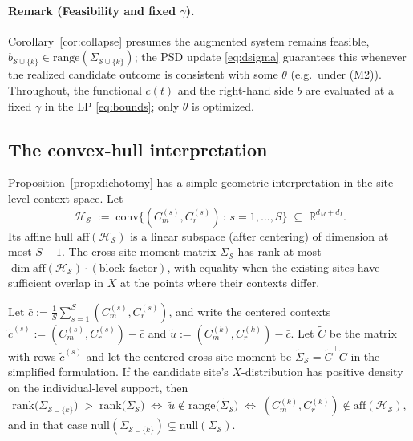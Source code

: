 \paragraph{Remark (Feasibility and fixed $\gamma$).}
Corollary~\ref{cor:collapse} presumes the augmented system remains feasible,
$b_{\mathcal{S}\cup\{k\}}\in\mathrm{range}(\Sigma_{\mathcal{S}\cup\{k\}})$; the
PSD update \eqref{eq:dsigma} guarantees this whenever the realized candidate
outcome is consistent with some $\theta$ (e.g.\ under (M2)). Throughout, the
functional $c(t)$ and the right-hand side $b$ are evaluated at a fixed $\gamma$
in the LP \eqref{eq:bounds}; only $\theta$ is optimized.

\subsection{The convex-hull interpretation}
\label{sec:hull-interp}

Proposition~\ref{prop:dichotomy} has a simple geometric interpretation in the
site-level context space. Let
\[
\mathcal{H}_\mathcal{S} \;:=\; \mathrm{conv}\!\bigl\{(C_m^{(s)}, C_r^{(s)})\,:\,
 s = 1, \ldots, S\bigr\} \;\subseteq\; \mathbb{R}^{d_M+d_I}.
\]
Its affine hull $\mathrm{aff}(\mathcal{H}_\mathcal{S})$ is a linear
subspace (after centering) of dimension at most $S-1$. The cross-site moment
matrix $\Sigma_\mathcal{S}$ has rank at most $\dim\mathrm{aff}(\mathcal{H}_\mathcal{S})
 \cdot (\text{block factor})$, with equality when the existing sites have
sufficient overlap in $X$ at the points where their contexts differ.

\begin{proposition}
\label{prop:hull}
Let $\bar c := \tfrac1S\sum_{s=1}^S (C_m^{(s)},C_r^{(s)})$, and write the
centered contexts $\tilde c^{(s)} := (C_m^{(s)},C_r^{(s)})-\bar c$ and
$\tilde u := (C_m^{(k)},C_r^{(k)})-\bar c$. Let $\tilde C$ be the matrix with
rows $\tilde c^{(s)}$ and let the centered cross-site moment be
$\tilde\Sigma_\mathcal{S}=\tilde C^\top\tilde C$ in the simplified formulation.
If the candidate site's $X$-distribution has
positive density on the individual-level support, then
\[
\mathrm{rank}\bigl(\Sigma_{\mathcal{S}\cup\{k\}}\bigr)
 \;>\; \mathrm{rank}\bigl(\Sigma_\mathcal{S}\bigr)
\;\Longleftrightarrow\;
 \tilde u\notin\mathrm{range}\bigl(\tilde\Sigma_\mathcal{S}\bigr)
\;\Longleftrightarrow\;
 (C_m^{(k)},C_r^{(k)})\notin\mathrm{aff}(\mathcal{H}_\mathcal{S}),
\]
and in that case
$\mathrm{null}(\Sigma_{\mathcal{S}\cup\{k\}})\subsetneq\mathrm{null}(\Sigma_\mathcal{S})$.
\end{proposition}

